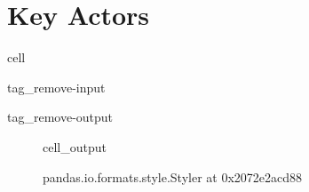 \documentclass[letterpaper,10pt,english]{jupyterBook}
\begin{document}
\chapter{Key Actors}
\label{\detokenize{Planning:key-actors}}
\begin{sphinxuseclass}{cell}
\begin{sphinxuseclass}{tag_remove-input}
\begin{sphinxuseclass}{tag_remove-output}
\end{sphinxuseclass}
\end{sphinxuseclass}
\end{sphinxuseclass}
\begin{figure}[htbp]
\centering
\capstart
\begin{sphinxVerbatimOutput}

\begin{sphinxuseclass}{cell_output}
\begin{sphinxVerbatim}[commandchars=\\\{\}]
\PYGZlt{}pandas.io.formats.style.Styler at 0x2072e2acd88\PYGZgt{}
\end{sphinxVerbatim}

\end{sphinxuseclass}\end{sphinxVerbatimOutput}
\caption{}\label{\detokenize{Planning:table2}}\end{figure}
\end{document}
